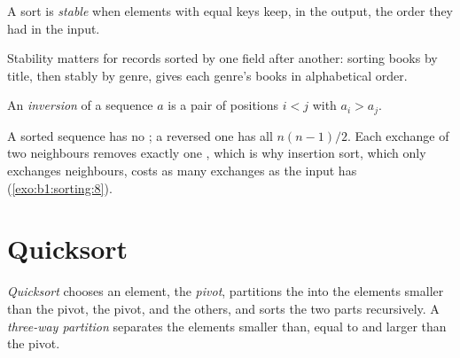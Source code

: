 \begin{definition}\label{def:b1:sorting:stable}
A sort is \emph{stable} when elements with equal keys keep, in the output, the order they had in the
input.
\end{definition}

Stability matters for records sorted by one field after another: sorting books by title, then stably by genre, gives
each genre's books in alphabetical order.

\begin{definition}[Inversion]\label{def:b1:sorting:inversion}
An \emph{inversion} of a sequence $a$ is a pair of positions $i < j$ with $a_i > a_j$.
\end{definition}

A sorted sequence has no ; a reversed one has all $n(n - 1)/2$. Each exchange of two neighbours removes exactly
one , which is why insertion sort, which only exchanges neighbours, costs as many exchanges as the input has
 (\cref{exo:b1:sorting:8}).


\section{Quicksort}\label{sec:b1:sorting:quicksort}

\begin{definition}\label{def:b1:sorting:quicksort}
\emph{Quicksort} chooses an element, the \emph{pivot}, partitions the  into the
elements smaller than the pivot, the pivot, and the others, and sorts the two parts recursively. A \emph{three-way
partition} separates the elements smaller than, equal to and larger than the
pivot.
\end{definition}

\label{lst:b1:sorting:quicksort}

